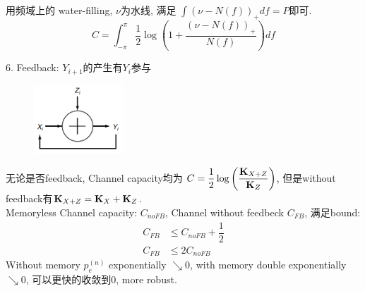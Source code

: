 用频域上的 water-filling, $\nu$为水线, 满足 $\int (\nu-N(f))_+ df=P$即可.
$$C=\int_{-\pi}^{\pi} \dfrac{1}{2}\log\left(1+\dfrac{(\nu-N(f))_+}{N(f)}\right) df$$

6. Feedback: $Y_{i+1}$的产生有$Y_i$参与
\begin{figure}[htbp]
    \centering
    \includegraphics[width=0.3\textwidth]{./figures/chapter7/feedback.png}
\end{figure}

无论是否feedback, Channel capacity均为 $C=\dfrac{1}{2}\log\left(\dfrac{\mathbf{K}_{X+Z}}{\mathbf{K}_Z}\right)$, 但是without feedback有$\mathbf{K}_{X+Z}=\mathbf{K}_X+\mathbf{K}_Z$. \\
Memoryless Channel capacity: $C_{noFB}$, Channel without feedbeck $C_{FB}$, 满足bound:
\begin{align*}
C_{FB} &\leq C_{noFB} + \dfrac{1}{2} \\
C_{FB} &\leq 2C_{noFB}
\end{align*}
Without memory $p_e^{(n)}$ exponentially $\searrow 0$, with memory double exponentially $\searrow 0$, 可以更快的收敛到0, more robust.
